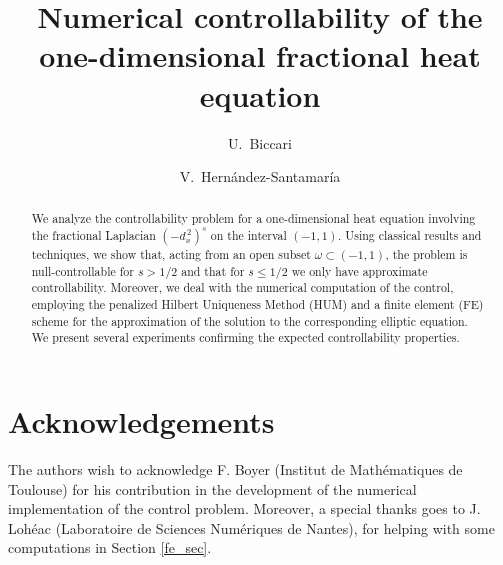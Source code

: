 \documentclass[preprint,1p]{amsart}
\title[Numerical controllability fractional heat equation]{Numerical controllability of the one-dimensional fractional heat equation}
\author{U.~Biccari}
\author{V.~Hern\'andez-Santamar\'ia}
\numberwithin{equation}{section}
\numberwithin{equation}{section}
\numberwithin{theorem}{section}
\numberwithin{remark}{section}
\numberwithin{lemma}{section}
\numberwithin{proposition}{section}
\numberwithin{definition}{section}
\newcommand{\fl}[2]{(-d_x^{\,2})^{#1}#2}
\begin{document}


\maketitle

\begin{abstract}
We analyze the controllability problem for a one-dimensional heat equation involving the fractional Laplacian $\fl{s}{}$ on the interval $(-1,1)$. Using classical results and techniques, we show that, acting from an open subset $\omega\subset(-1,1)$, the problem is null-controllable for $s>1/2$ and that for $s\leq 1/2$ we only have approximate controllability. Moreover, we deal with the numerical computation of the control, employing the penalized Hilbert Uniqueness Method (HUM) and a finite element (FE) scheme for the approximation of the solution to the corresponding elliptic equation. We present several experiments confirming the expected controllability properties.
\end{abstract}



%
%
%

\section*{Acknowledgements}
The authors wish to acknowledge F. Boyer (Institut de Math\'ematiques de Toulouse) for his contribution in the development of the numerical implementation of the control problem. Moreover, a special thanks goes to J. Loh\'eac (Laboratoire de Sciences Num\'eriques de Nantes), for helping with some computations in Section \ref{fe_sec}.  


\end{document}
